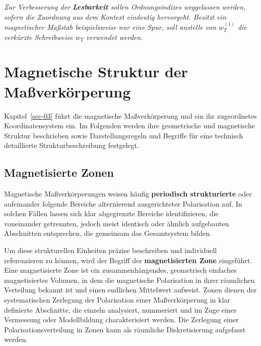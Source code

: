 \documentclass[
  ngerman,
  a4paper,
  twoside]{scrbook}
\newcounter{quartocallouttipno}
\newcommand{\quartocallouttip}[1]{\refstepcounter{quartocallouttipno}\label{#1}}
\begin{document}
\begin{tcolorbox}[enhanced jigsaw, arc=.35mm, bottomrule=.15mm, bottomtitle=1mm, breakable, colback=white, colbacktitle=quarto-callout-tip-color!10!white, colframe=quarto-callout-tip-color-frame, coltitle=black, left=2mm, leftrule=.75mm, opacityback=0, opacitybacktitle=0.6, rightrule=.15mm, title=\textcolor{quarto-callout-tip-color}{\faLightbulb}\hspace{0.5em}{Hinweis \ref*{tip-03-lesbarkeit}}, titlerule=0mm, toprule=.15mm, toptitle=1mm]

\quartocallouttip{tip-03-lesbarkeit} 

\emph{Zur Verbesserung der \textbf{Lesbarkeit} sollen Ordnungsindizes
weggelassen werden, sofern die Zuordnung aus dem Kontext eindeutig
hervorgeht. Besitzt ein magnetischer Maßstab beispielsweise nur eine
Spur, soll anstelle von \(w_T^{(1)}\) die verkürzte Schreibweise \(w_T\)
verwendet werden.}

\end{tcolorbox}


\chapter{Magnetische Struktur der Maßverkörperung}\label{sec-04}

Kapitel~\ref{sec-03} führt die magnetische Maßverkörperung und ein ihr
zugeordnetes Koordinatensystem ein. Im Folgenden werden ihre
geometrische und magnetische Struktur beschrieben sowie
Darstellungsregeln und Begriffe für eine technisch detaillierte
Strukturbeschreibung festgelegt.

\section{Magnetisierte Zonen}\label{sec-04-magnetisierte_zonen}

Magnetische Maßverkörperungen weisen häufig \textbf{periodisch
strukturierte} oder aufeinander folgende Bereiche alternierend
ausgerichteter Polarisation auf. In solchen Fällen lassen sich klar
abgegrenzte Bereiche identifizieren, die voneinander getrennten, jedoch
meist identisch oder ähnlich aufgebauten Abschnitten entsprechen, die
gemeinsam das Gesamtsystem bilden.

Um diese strukturellen Einheiten präzise beschreiben und individuell
referenzieren zu können, wird der Begriff der \textbf{magnetisierten
Zone} eingeführt. Eine magnetisierte Zone ist ein zusammenhängendes,
geometrisch einfaches magnetisiertes Volumen, in dem die magnetische
Polarisation in ihrer räumlichen Verteilung bekannt ist und einen
endlichen Mittelwert aufweist. Zonen dienen der systematischen Zerlegung
der Polarisation einer Maßverkörperung in klar definierte Abschnitte,
die einzeln analysiert, nummeriert und im Zuge einer Vermessung oder
Modellbildung charakterisiert werden. Die Zerlegung einer
Polarisationsverteilung in Zonen kann als räumliche Diskretisierung
aufgefasst werden.
\end{document}
